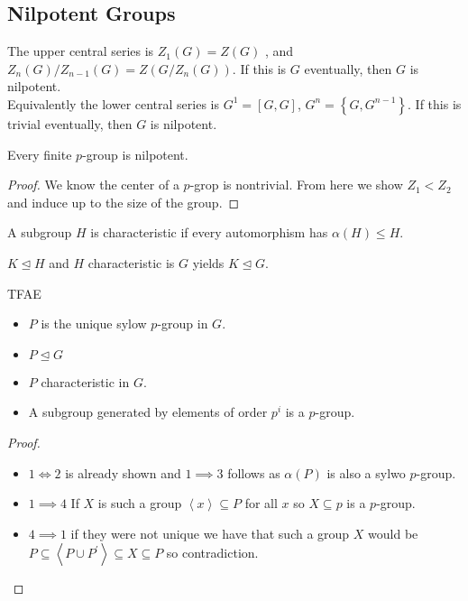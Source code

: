 \subsection{Nilpotent Groups}
\begin{definition}
	The upper central series is \(Z_1\left( G \right)  = Z\left( G \right) \) , and \(Z_{n}\left( G \right) / Z_{n-1}\left( G \right)  = Z\left( G / Z_{n}\left( G \right)  \right) \). If this is \(G\) eventually, then \(G\) is nilpotent.\\
	Equivalently the lower central series is \(G^{1} = \left[ G, G \right] \), \(G^{n} = \left\{ G, G^{n-1} \right\} \). If this is trivial eventually, then \(G\) is nilpotent.
\end{definition}
\begin{theorem}
	Every finite \(p\)-group is nilpotent.
\end{theorem}
\begin{proof}
	We know the center of a \(p\)-grop is nontrivial. From here we show \(Z_1 < Z_2\) and induce up to the size of the group.
\end{proof}
\begin{definition}
	A subgroup \(H\)  is characteristic if every automorphism has \(\alpha\left( H \right)  \le H\).
\end{definition}
\begin{remark}
	\(K\trianglelefteq H\) and \(H\) characteristic is \(G\)  yields \(K\trianglelefteq G\).
\end{remark}
\begin{theorem}
	TFAE
	\begin{itemize}
		\item \(P\) is the unique sylow \(p\)-group in \(G\).
			\item \(P\trianglelefteq G\)
				\item \(P\) characteristic in \(G\).
					\item A subgroup generated by elements of order \(p^{i}\) is a \(p\)-group.
	\end{itemize}
\end{theorem}
\begin{proof}
	\begin{itemize}
		\item \(1 \iff 2\) is already shown and \(1 \implies 3\) follows as \(\alpha\left( P \right) \) is also a sylwo \(p\)-group.
\item \(1 \implies 4\) If \(X\) is such a group \(\left<x \right> \subseteq P\)  for all \(x\) so \(X \subseteq p\) is a \(p\)-group.
	\item \(4 \implies 1\) if they were not unique we have that such a group \(X\) would be \( P \subseteq \left< P \cup P^{\prime} \right>  \subseteq X \subseteq P\) so contradiction.
	\end{itemize}
\end{proof}
